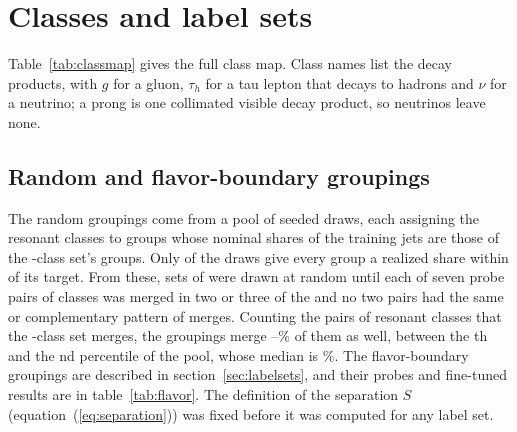 \section{Classes and label sets}\label{app:sets}
Table~\ref{tab:classmap} gives the full class map.
Class names list the decay products, with $g$ for a gluon, $\tau_h$ for a tau lepton that decays to hadrons and
$\nu$ for a neutrino; a prong is one collimated visible decay product, so neutrinos leave none.

\subsection{Random and flavor-boundary groupings}\label{app:flavor}
The random groupings come from a pool of \RevPoolDraws{} seeded draws, each assigning the resonant classes to
\RandVtwoNResGroups{} groups whose nominal shares of the training jets are those of the \Kcoarse-class set's groups.
Only \RevPoolRuleThree{} of the draws give every group a realized share within \RandVtwoShareTol{} of its target.
From these, sets of \VRandWord{} were drawn at random until each of seven probe pairs of classes was merged in two or
three of the \VRandWord{} and no two pairs had the same or complementary pattern of merges.
Counting the pairs of resonant classes that the \Kcoarse-class set merges, the \VRandWord{} groupings merge
\RevPoolOverlapLoPct--\RevPoolOverlapHiPct\% of them as well, between the \RevPoolPctileLo th and the
\RevPoolPctileHi nd percentile of the pool, whose median is \RevPoolOverlapMedianPct\%.
The flavor-boundary groupings are described in section~\ref{sec:labelsets}, and their probes and fine-tuned results
are in table~\ref{tab:flavor}.
The definition of the separation $S$ (equation~(\ref{eq:separation})) was fixed before it was computed for any label
set.



